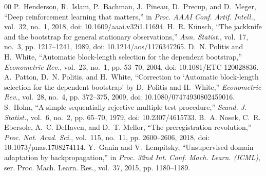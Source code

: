 \documentclass[conference]{IEEEtran}
\begin{document}
\begin{thebibliography}{00}
 P.~Henderson, R.~Islam, P.~Bachman, J.~Pineau, D.~Precup, and D.~Meger, ``Deep reinforcement learning that matters,'' in \emph{Proc. AAAI Conf. Artif. Intell.}, vol.~32, no.~1, 2018, doi: 10.1609/aaai.v32i1.11694.
 H.~R. K{\"u}nsch, ``The jackknife and the bootstrap for general stationary observations,'' \emph{Ann. Statist.}, vol.~17, no.~3, pp. 1217--1241, 1989, doi: 10.1214/aos/1176347265.
 D.~N. Politis and H.~White, ``Automatic block-length selection for the dependent bootstrap,'' \emph{Econometric Rev.}, vol.~23, no.~1, pp. 53--70, 2004, doi: 10.1081/ETC-120028836.
 A.~Patton, D.~N. Politis, and H.~White, ``Correction to `Automatic block-length selection for the dependent bootstrap' by D.~Politis and H.~White,'' \emph{Econometric Rev.}, vol.~28, no.~4, pp. 372--375, 2009, doi: 10.1080/07474930802459016.
 S.~Holm, ``A simple sequentially rejective multiple test procedure,'' \emph{Scand. J. Statist.}, vol.~6, no.~2, pp. 65--70, 1979, doi: 10.2307/4615733.
 B.~A. Nosek, C.~R. Ebersole, A.~C. DeHaven, and D.~T. Mellor, ``The preregistration revolution,'' \emph{Proc. Nat. Acad. Sci.}, vol.~115, no.~11, pp. 2600--2606, 2018, doi: 10.1073/pnas.1708274114.
 Y.~Ganin and V.~Lempitsky, ``Unsupervised domain adaptation by backpropagation,'' in \emph{Proc. 32nd Int. Conf. Mach. Learn. (ICML)}, ser. Proc. Mach. Learn. Res., vol.~37, 2015, pp. 1180--1189.
\end{thebibliography}
\end{document}
